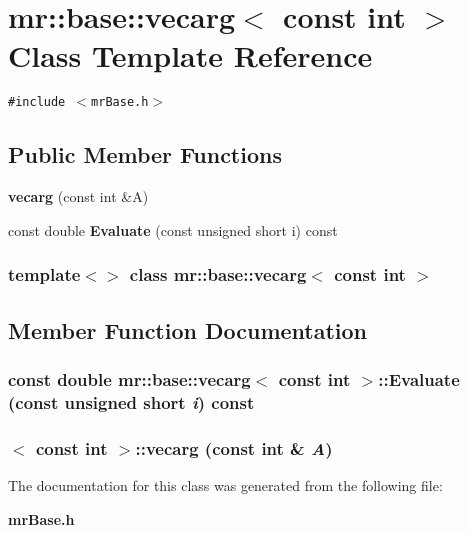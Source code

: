 \section{mr::base::vecarg$<$ const int $>$ Class Template Reference}
\label{classmr_1_1base_1_1vecarg_3_01const_01int_01_4}
{\tt \#include $<$mr\-Base.h$>$}

\subsection*{Public Member Functions}
\begin{CompactItemize}
\item 
{\bf vecarg} (const int \&A)
\item 
const double {\bf Evaluate} (const unsigned short i) const 
\end{CompactItemize}
\subsubsection*{template$<$$>$ class mr::base::vecarg$<$ const int $>$}



\subsection{Member Function Documentation}
\subsubsection{\setlength{\rightskip}{0pt plus 5cm}const double {\bf mr::base::vecarg}$<$ const int $>$::Evaluate (const unsigned short {\em i}) const\hspace{0.3cm}{\tt  [inline]}}\label{classmr_1_1base_1_1vecarg_3_01const_01int_01_4_a1}


\subsubsection{$<$ const int $>$::{\bf vecarg} (const int \& {\em A})\hspace{0.3cm}{\tt  [inline]}}\label{classmr_1_1base_1_1vecarg_3_01const_01int_01_4_a0}




The documentation for this class was generated from the following file:\begin{CompactItemize}
\item 
{\bf mr\-Base.h}\end{CompactItemize}
